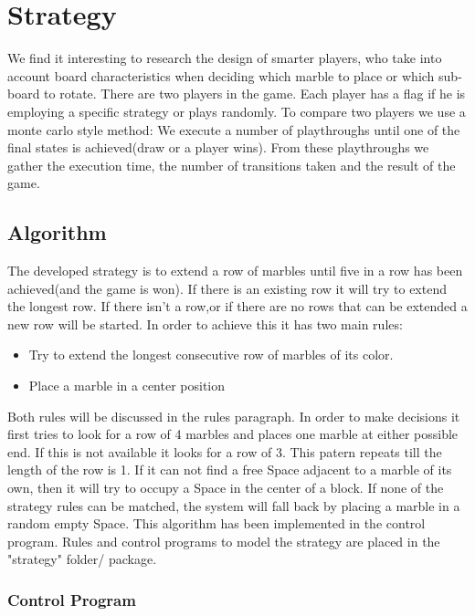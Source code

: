 \section{Strategy}
\label{Strategy}
We find it interesting to research the design of smarter players, who take into account board characteristics when deciding which marble to place or which sub-board to rotate.
There are two players in the game. Each player has a flag if he is employing a specific strategy or plays randomly. 
To compare two players we use a monte carlo style method: We execute a number of playthroughs until one of the final states is achieved(draw or a player wins).
From these playthroughs we gather the execution time, the number of transitions taken and the result of the game.

\vspace{6pt}
\subsection{Algorithm}
The developed strategy is to extend a row of marbles until five in a row has been achieved(and the game is won).
If there is an existing row it will try to extend the longest row.
If there isn't a row,or if there are no rows that can be extended a new row will be started.
 In order to achieve this it has two main rules:
\begin{itemize}
\item Try to extend the longest consecutive row of marbles of its color.
\item Place a marble in a center position
\end{itemize}
Both rules will be discussed in the rules paragraph.
In order to make decisions it first tries to look for a row of 4 marbles and places one marble at either possible end. If this is not available it looks for a row of 3. This patern repeats till the length of the row is 1.
If it can not find a free Space adjacent to a marble of its own, then it will try to occupy a Space in the center of a block.
If none of the strategy rules can be matched, the system will fall back by placing a marble in a random empty Space.
This algorithm has been implemented in the control program.
Rules and control programs to model the strategy are placed in the "strategy" folder/ package.

\subsubsection{Control Program}

